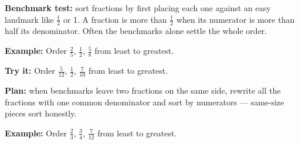 \documentclass[12pt]{article}
\begin{document}


\begin{formulabox}
\textbf{Benchmark test:} sort fractions by first placing each one against an
easy landmark like $\tfrac{1}{2}$ or 1. A fraction is more than
$\tfrac{1}{2}$ when its numerator is more than half its denominator. Often
the benchmarks alone settle the whole order.
\end{formulabox}

\begin{examplebox}
\textbf{Example:} \quad Order $\tfrac{2}{5}$, $\tfrac{1}{2}$, $\tfrac{5}{8}$
from least to greatest.
\end{examplebox}

\begin{tryitbox}
\textbf{Try it:} \quad Order $\tfrac{5}{12}$, $\tfrac{1}{2}$,
$\tfrac{7}{10}$ from least to greatest.\\[2pt]
\end{tryitbox}


\begin{formulabox}
\textbf{Plan:} when benchmarks leave two fractions on the same side, rewrite
all the fractions with one common denominator and sort by numerators ---
same-size pieces sort honestly.
\end{formulabox}

\begin{examplebox}
\textbf{Example:} \quad Order $\tfrac{2}{3}$, $\tfrac{3}{4}$,
$\tfrac{7}{12}$ from least to greatest.
\end{examplebox}
\end{document}
